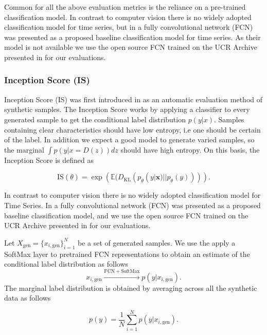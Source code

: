 \documentclass[../../thesis.tex]{subfiles}
\begin{document}
Common for all the above evaluation metrics is the reliance on a pre-trained classification model. In contrast to computer vision there is no widely adopted classification model for time series, but in \cite{wang2016time} a fully convolutional network (FCN) was presented as a proposed baseline classification model for time series. As their model is not available we use the open source FCN trained on the UCR Archive presented in \cite{TimeVQVAE} for our evaluations.\newline

\subsubsection{Inception Score (IS)}

Inception Score (IS) was first introduced in \cite{salimans2016improved} as an automatic evaluation method of synthetic samples.\newline
The Inception Score works by applying a classifier to every generated sample to get the conditional label distribution $p(y|x)$. Samples containing clear characteristics should have low entropy, i.e one should be certain of the label. In addition we expect a good model to generate varied samples, so the marginal $\int p(y|x = D(z))dz$ should have high entropy. On this basis, the Inception Score is defined as 

\begin{equation}
    \label{IS}
    {\text{IS}}(\theta) = \exp\left( \mathbb{E}(D_{\text{KL}}(p_\theta(y|\mathbf{x}) || p_\theta(y))) \right).
\end{equation}

In contrast to computer vision there is no widely adopted classification model for Time Series. In \cite{wang2016time} a fully convolutional network (FCN) was presented as a proposed baseline classification model, and we use the open source FCN trained on the UCR Archive presented in \cite{TimeVQVAE} for our evaluations. \newline

Let $X_{\text{gen}} = \{x_{i,\text{gen}}\}_{i=1}^N$ be a set of generated samples. We use the apply a SoftMax layer to pretrained FCN representations to obtain an estimate of the conditional label distribution as follows
\[
    x_{i,\text{gen}} \xrightarrow{\mathrm{FCN} + \mathrm{SoftMax}} p(y |x_{i,\text{gen}}).
\]
The marginal label distribution is obtained by averaging across all the synthetic data as follows

\[
    p(y) = \frac{1}{N} \sum_{i=1}^N p(y |x_{i,\text{gen}}).
\]
\end{document}
